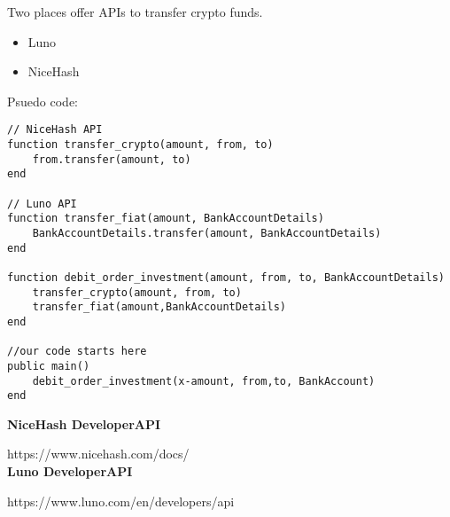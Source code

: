Two places offer APIs to transfer crypto funds.

\begin{itemize}
\item Luno
\item NiceHash
\end{itemize}

Psuedo code:

\begin{verbatim}
// NiceHash API
function transfer_crypto(amount, from, to)
    from.transfer(amount, to)
end

// Luno API
function transfer_fiat(amount, BankAccountDetails)
    BankAccountDetails.transfer(amount, BankAccountDetails)
end

function debit_order_investment(amount, from, to, BankAccountDetails)
    transfer_crypto(amount, from, to)
    transfer_fiat(amount,BankAccountDetails)
end

//our code starts here
public main()
    debit_order_investment(x-amount, from,to, BankAccount)
end
\end{verbatim}

\textbf{NiceHash DeveloperAPI}
 
https://www.nicehash.com/docs/ \\

\textbf{Luno DeveloperAPI}

https://www.luno.com/en/developers/api \\











